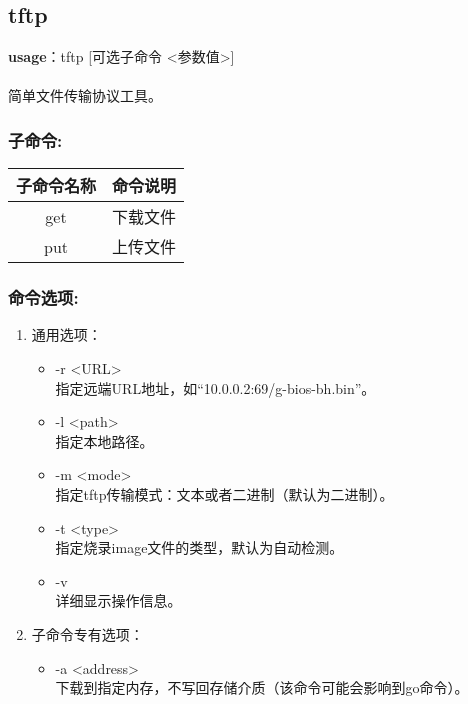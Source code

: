 \subsection{tftp}
\textbf{usage}：tftp [可选子命令 <参数值>] \\
\\ 简单文件传输协议工具。

\subsubsection{子命令:}
\begin{table}[H]
\setlength{\parindent}{0pt}
\begin{tabular}{|c|l|} \hline
子命令名称 & 命令说明 \\ \hline
get & 下载文件 \\ \hline
put & 上传文件 \\ \hline
\end{tabular}
\end{table}

\subsubsection{命令选项:}
\begin{enumerate}
	\item 通用选项：
	\begin{itemize}
		\item -r <URL> \\
		指定远端URL地址，如``10.0.0.2:69/g-bios-bh.bin''。
		\item -l <path> \\
		指定本地路径。%
		\item -m <mode> \\
		指定tftp传输模式：文本或者二进制（默认为二进制）。
		\item -t <type> \\
		指定烧录image文件的类型，默认为自动检测。
		\item -v \\
		详细显示操作信息。
	\end{itemize}

	\item 子命令专有选项：
	\begin{itemize}
		\item -a <address> \\
		下载到指定内存，不写回存储介质（该命令可能会影响到go命令）。
	\end{itemize}
\end{enumerate}


